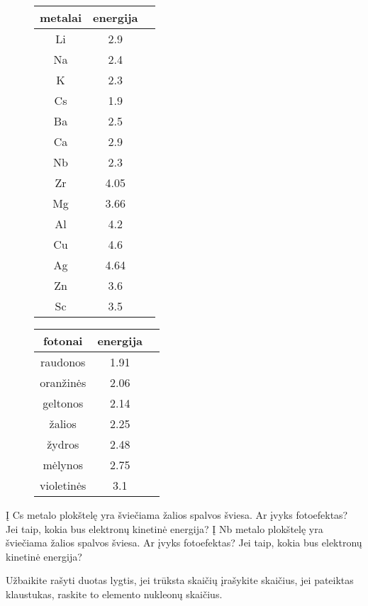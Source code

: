 \documentclass{exam}
\begin{document}
\begin{questions}
	\begin{figure}
        \centering
        \begin{tabular}{ |c|c|c| } 
        \hline 
metalai & energija \\ 
 \hline Li & 2.9 \\ 
 \hline Na & 2.4 \\ 
 \hline K & 2.3 \\ 
 \hline Cs & 1.9 \\ 
 \hline Ba & 2.5 \\ 
 \hline Ca & 2.9 \\ 
 \hline Nb & 2.3 \\ 
 \hline Zr & 4.05 \\ 
 \hline Mg & 3.66 \\ 
 \hline Al & 4.2 \\ 
 \hline Cu & 4.6 \\ 
 \hline Ag & 4.64 \\ 
 \hline Zn & 3.6 \\ 
 \hline Sc & 3.5 \\ 
 \hline  
 \end{tabular} 
 \end{figure} 
\begin{figure}
        \centering
        \begin{tabular}{ |c|c|c| } 
        \hline 
fotonai & energija \\ 
 \hline raudonos & 1.91 \\ 
 \hline oranžinės & 2.06 \\ 
 \hline geltonos & 2.14 \\ 
 \hline žalios & 2.25 \\ 
 \hline žydros & 2.48 \\ 
 \hline mėlynos & 2.75 \\ 
 \hline violetinės & 3.1 \\ 
 \hline  
 \end{tabular} 
 \end{figure} 

	\question Į Cs metalo plokštelę yra šviečiama žalios spalvos šviesa. Ar įvyks fotoefektas? Jei taip, kokia bus elektronų kinetinė energija?
\question Į Nb metalo plokštelę yra šviečiama žalios spalvos šviesa. Ar įvyks fotoefektas? Jei taip, kokia bus elektronų kinetinė energija?

	\question Užbaikite rašyti duotas lygtis, jei trūksta skaičių įrašykite skaičius, jei pateiktas klaustukas, 
raskite to elemento nukleonų skaičius.
	\end{questions}
	
\end{document}
